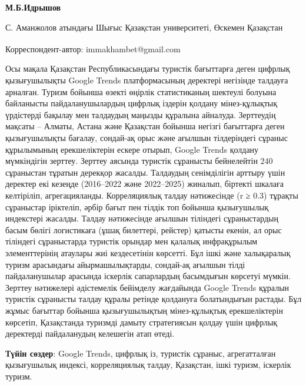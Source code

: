 
\begin{articleheader}

{\bfseries
М.Б.Идрышов
}
\end{articleheader}

\begin{affiliation}
С. Аманжолов атындағы Шығыс Қазақстан университеті, Өскемен Қазақстан

\raggedright \textsuperscript{\envelope }Корреспондент-автор: immakhambet@gmail.com
\end{affiliation}

Осы мақала Қазақстан Республикасындағы туристік бағыттарға деген цифрлық
қызығушылықты Google Trends платформасының деректері негізінде талдауға
арналған. Туризм бойынша өзекті өңірлік статистиканың шектеулі болуына
байланысты пайдаланушылардың цифрлық іздерін қолдану мінез-құлықтық
үрдістерді бақылау мен талдаудың маңызды құралына айналуда. Зерттеудің
мақсаты -- Алматы, Астана және Қазақстан бойынша негізгі бағыттарға
деген қызығушылықты бағалау, сондай-ақ орыс және ағылшын тілдеріндегі
сұраныс құрылымының ерекшеліктерін ескере отырып, Google Trends қолдану
мүмкіндігін зерттеу. Зерттеу аясында туристік сұранысты бейнелейтін 240
сұраныстан тұратын дерекқор жасалды. Талдаудың сенімділігін арттыру үшін
деректер екі кезеңде (2016--2022 және 2022--2025) жиналып, біртекті
шкалаға келтіріліп, агрегацияланды. Корреляциялық талдау нәтижесінде (r
≥ 0.3) тұрақты сұраныстар іріктеліп, әрбір бағыт пен тілдік топ бойынша
қызығушылық индекстері жасалды. Талдау нәтижесінде ағылшын тіліндегі
сұраныстардың басым бөлігі логистикаға (ұшақ билеттері, рейстер) қатысты
екенін, ал орыс тіліндегі сұраныстарда туристік орындар мен қалалық
инфрақұрылым элементтерінің атаулары жиі кездесетінін көрсетті. Бұл ішкі
және халықаралық туризм арасындағы айырмашылықтарды, сондай-ақ ағылшын
тілді пайдаланушылар арасында іскерлік сапарлардың басымдығын көрсетуі
мүмкін. Зерттеу нәтижелері әдістемелік бейімделу жағдайында Google
Trends құралын туристік сұранысты талдау құралы ретінде қолдануға
болатындығын растады. Бұл жұмыс бағыттар бойынша қызығушылықтың
мінез-құлықтық ерекшеліктерін көрсетіп, Қазақстанда туризмді дамыту
стратегиясын қолдау үшін цифрлық деректерді пайдаланудың келешегін атап
өтеді.

{\bfseries Түйін сөздер}: Google Trends, цифрлық із, туристік сұраныс,
агрегатталған қызығушылық индексі, корреляциялық талдау, Қазақстан, ішкі
туризм, іскерлік туризм.

